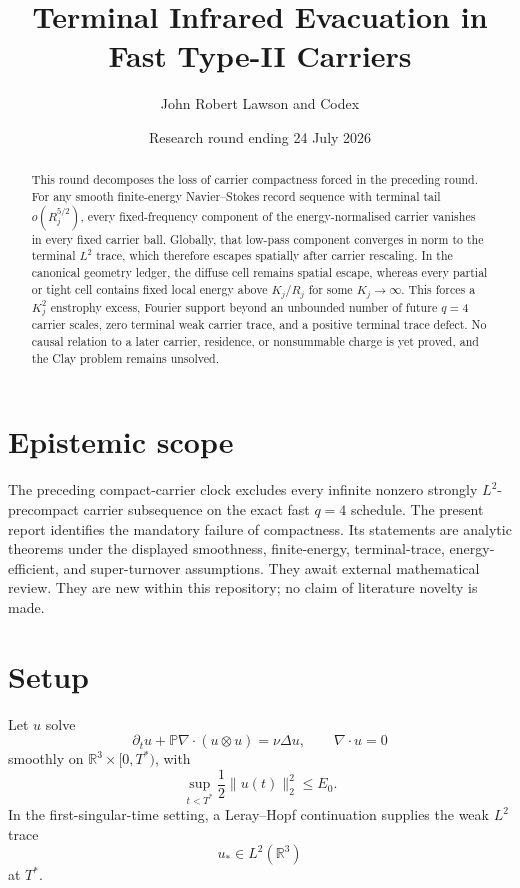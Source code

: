 \documentclass[11pt]{article}
\title{Terminal Infrared Evacuation in Fast Type-II Carriers}
\author{John Robert Lawson and Codex}
\date{Research round ending 24 July 2026}
\theoremstyle{remark}
\newcommand{\R}{\mathbb R}
\begin{document}
\maketitle

\begin{abstract}
This round decomposes the loss of carrier compactness forced in the preceding
round.  For any smooth finite-energy Navier--Stokes record sequence with
terminal tail \(o(R_j^{5/2})\), every fixed-frequency component of the
energy-normalised carrier vanishes in every fixed carrier ball.  Globally,
that low-pass component converges in norm to the terminal \(L^2\) trace,
which therefore escapes spatially after carrier rescaling.  In the canonical
geometry ledger, the diffuse cell remains spatial escape, whereas every
partial or tight cell contains fixed local energy above
\(K_j/R_j\) for some \(K_j\to\infty\).  This forces a \(K_j^2\) enstrophy
excess, Fourier support beyond an unbounded number of future \(q=4\)
carrier scales, zero terminal weak carrier trace, and a positive terminal
trace defect.  No causal relation to a later carrier, residence, or
nonsummable charge is yet proved, and the Clay problem remains unsolved.
\end{abstract}

\section{Epistemic scope}

The preceding compact-carrier clock excludes every infinite nonzero strongly
\(L^2\)-precompact carrier subsequence on the exact fast \(q=4\) schedule.
The present report identifies the mandatory failure of compactness.  Its
statements are analytic theorems under the displayed smoothness,
finite-energy, terminal-trace, energy-efficient, and super-turnover
assumptions.  They await external mathematical review.  They are new within
this repository; no claim of literature novelty is made.

\section{Setup}

Let \(u\) solve
\[
 \partial_tu+\mathbb P\nabla\!\cdot(u\otimes u)
 =
 \nu\Delta u,
 \qquad
 \nabla\cdot u=0
\]
smoothly on \(\R^3\times[0,T^*)\), with
\[
 \sup_{t<T^*}\frac12\|u(t)\|_2^2\le E_0.
\]
In the first-singular-time setting, a Leray--Hopf continuation supplies the
weak \(L^2\) trace
\[
 u_*\in L^2(\R^3)
\]
at \(T^*\).
\end{document}
